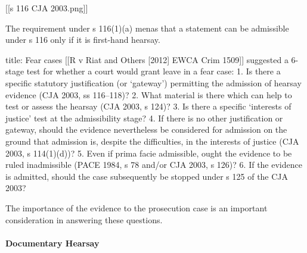 \documentclass[
]{article}
\newenvironment{Shaded}{}{}
\newcommand{\NormalTok}[1]{#1}
\begin{document}
{[}{[}s 116 CJA 2003.png{]}{]}

\begin{Shaded}
\begin{Highlighting}[]
\NormalTok{The requirement under s 116(1)(a) menas that a statement can be admissible under s 116 only if it is first{-}hand hearsay. }
\end{Highlighting}
\end{Shaded}

\begin{Shaded}
\begin{Highlighting}[]
\NormalTok{title: Fear cases}
\NormalTok{[[R v Riat and Others [2012] EWCA Crim 1509]] suggested a 6{-}stage test for whether a court would grant leave in a fear case:}
\NormalTok{1. Is there a specific statutory justification (or ‘gateway’) permitting the admission of hearsay evidence (CJA 2003, ss 116–118)?}
\NormalTok{2. What material is there which can help to test or assess the hearsay (CJA 2003, s 124)?}
\NormalTok{3. Is there a specific ‘interests of justice’ test at the admissibility stage?}
\NormalTok{4. If there is no other justification or gateway, should the evidence nevertheless be considered for admission on the ground that admission is, despite the difficulties, in the interests of justice (CJA 2003, s 114(1)(d))?}
\NormalTok{5. Even if prima facie admissible, ought the evidence to be ruled inadmissible (PACE 1984, s 78 and/or CJA 2003, s 126)?}
\NormalTok{6. If the evidence is admitted, should the case subsequently be stopped under s 125 of the CJA 2003?}

\NormalTok{The importance of the evidence to the prosecution case is an important consideration in answering these questions. }
\end{Highlighting}
\end{Shaded}

\hypertarget{documentary-hearsay}{%
\paragraph{Documentary Hearsay}\label{documentary-hearsay}}
\end{document}
